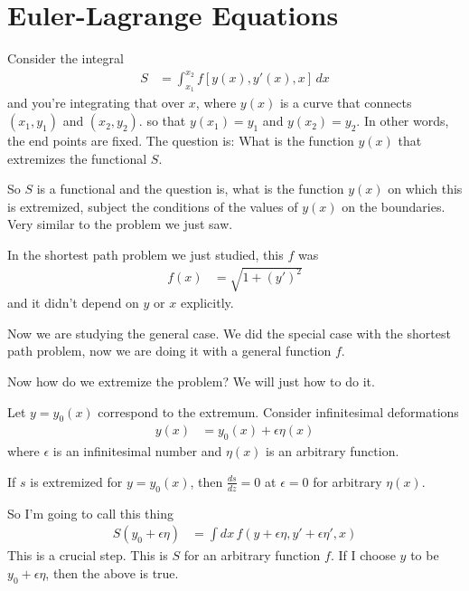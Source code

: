 \section{Euler-Lagrange Equations}
Consider the integral
\begin{align}
    S &=
    \int_{x_1}^{x_2}
    f\left[
        y(x), y'(x), x
    \right]
    \,dx
\end{align}
and you're integrating that over $x$,
where $y(x)$ is a curve that connects
$(x_1,y_1)$ and $(x_2,y_2)$.
so that
$y(x_1)=y_1$ and $y(x_2)=y_2$.
In other words,
the end points are fixed.
The question is:
What is the function $y(x)$ that extremizes the functional $S$.

So $S$ is a functional and the question is,
what is the function $y(x)$ on which this is extremized,
subject the conditions of the values of $y(x)$ on the boundaries.
Very similar to the problem we just saw.

In the shortest path problem we just studied,
this $f$ was 
\begin{align}
    f(x) &= \sqrt{1 + \left( y' \right)^2}
\end{align}
and it didn't depend on $y$ or $x$ explicitly.

Now we are studying the general case.
We did the special case with the shortest path problem,
now we are doing it with a general function $f$.

Now how do we extremize the problem?
We will just how to do it.

Let $y=y_0(x)$ correspond to the extremum.
Consider infinitesimal deformations 
\begin{align}
    y(x) &= y_0(x) + \epsilon \eta(x)
\end{align}
where $\epsilon$ is an infinitesimal number
and $\eta(x)$ is an arbitrary function.

If $s$ is extremized for $y=y_0(x)$,
then $\frac{ds}{dz}=0$
at $\epsilon = 0$
for arbitrary $\eta(x)$.

So I'm going to call this thing
\begin{align}
    S(y_0 + \epsilon\eta) &=
    \int dx\, f\left(y + \epsilon\eta, y' + \epsilon\eta', x\right)
\end{align}
This is a crucial step.
This is $S$ for an arbitrary function $f$.
If I choose $y$ to be $y_0 + \epsilon\eta$,
then the above is true.

